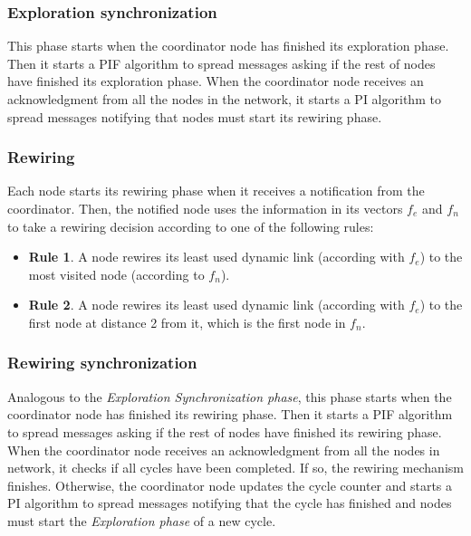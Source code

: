 \subsubsection{Exploration synchronization}

This phase starts when the coordinator node has finished its exploration phase. Then it starts a PIF algorithm to spread messages asking if the rest of nodes have finished its exploration phase. When the coordinator node receives an acknowledgment from all the nodes in the network,  it starts a PI algorithm to spread messages notifying that nodes must start its rewiring phase.

\subsubsection{Rewiring}

Each node starts its rewiring phase when it receives a notification from the coordinator. Then, the notified node uses the information in its vectors $f_e$ and $f_n$ to take a rewiring decision according to one of the following rules:
\begin{itemize}
    \item \textbf{Rule 1}. A node rewires its least used dynamic link (according with $f_e$) to the most visited node (according to $f_n$).
    \item \textbf{Rule 2}. A node rewires its least used dynamic link (according with $f_e$) to the first node at distance 2 from it, which is the first node in $f_n$.
\end{itemize}

\subsubsection{Rewiring synchronization}

Analogous to the \textit{Exploration Synchronization phase}, this phase starts when the coordinator node has finished its rewiring phase. Then it starts a PIF algorithm to spread messages asking if the rest of nodes have finished its rewiring phase. When the coordinator node receives an acknowledgment from all the nodes in network, it checks if all cycles have been completed. If so, the rewiring mechanism finishes. Otherwise, the coordinator node updates the cycle counter and starts a PI algorithm to spread messages notifying that the cycle has finished and nodes must start the \textit{Exploration phase} of a new cycle.
